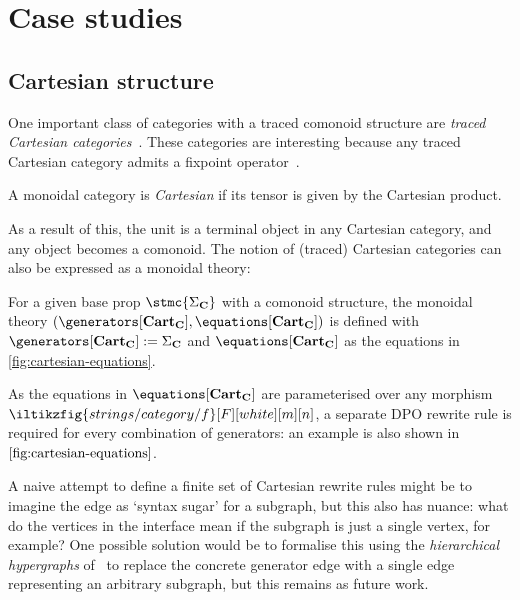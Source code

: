 \section{Case studies}

\subsection{Cartesian structure}

One important class of categories with a traced comonoid structure are
\emph{traced Cartesian categories}~\cite{cazanescu1990new,hasegawa1997recursion}.
These categories are interesting because any traced Cartesian
category admits a fixpoint operator~\cite[Thm. 3.1]{hasegawa1997recursion}.

\begin{definition}
    A monoidal category is \emph{Cartesian} if its tensor is given by the
    Cartesian product.
\end{definition}

As a result of this, the unit is a terminal object in any Cartesian category,
and any object becomes a comonoid.
The notion of (traced) Cartesian categories can also be expressed as a monoidal
theory:

\begin{definition}
    For a given base prop \(\stmc{\Sigma_\mathbf{C}}\) with a comonoid
    structure, the monoidal theory \((
        \generators[\mathbf{Cart}_\mathbf{C}],
        \equations[\mathbf{Cart}_\mathbf{C}]
    )\) is defined with \(
        \generators[\mathbf{Cart}_\mathbf{C}] := \Sigma_\mathbf{C}
    \) and \(
        \equations[\mathbf{Cart}_\mathbf{C}]
    \) as the equations in \cref{fig:cartesian-equations}.
\end{definition}

As the equations in \(\equations[\mathbf{Cart}_\mathbf{C}]\) are parameterised
over any morphism \(\iltikzfig{strings/category/f}[F][white][m][n]\), a separate
DPO rewrite rule is required for every combination of generators: an example is
also shown in \(\cref{fig:cartesian-equations}\).

\begin{remark}
    A naive attempt to define a finite set of Cartesian rewrite rules might be
    to imagine the edge as `syntax sugar' for a subgraph, but this also has
    nuance: what do the vertices in the interface mean if the subgraph is just a
    single vertex, for example?
    One possible solution would be to formalise this using the
    \emph{hierarchical hypergraphs} of~\cite{alvarez-picallo2022rewriting} to
    replace the concrete generator edge with a single edge representing an
    arbitrary subgraph, but this remains as future work.
\end{remark}

